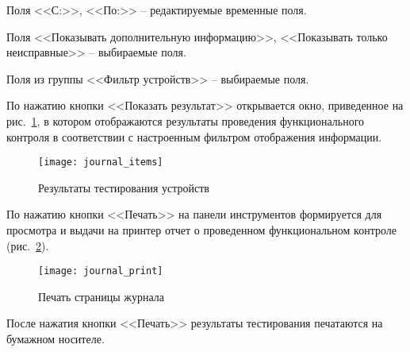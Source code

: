 Поля <<С:>>, <<По:>> – редактируемые временные поля.

Поля <<Показывать дополнительную информацию>>, <<Показывать только неисправные>> – выбираемые поля.

Поля из группы <<Фильтр устройств>> – выбираемые поля.

По нажатию кнопки <<Показать результат>> открывается окно, приведенное на
рис.~\ref{fig:guide:user_guide:journal:journal_items}, в котором отображаются результаты проведения функционального контроля
в соответствии с настроенным фильтром отображения информации.
\begin{figure}[h]
	\centering
	\texttt{[image: journal\_items]}
	\caption{Результаты тестирования устройств}
	\label{fig:guide:user_guide:journal:journal_items}
\end{figure}

По нажатию кнопки <<Печать>> на панели инструментов формируется для просмотра и выдачи на принтер отчет о проведенном
функциональном контроле (рис.~\ref{fig:guide:user_guide:journal:journal_print}).
\begin{figure}[!htb]
	\centering
	\texttt{[image: journal\_print]}
	\caption{Печать страницы журнала}
	\label{fig:guide:user_guide:journal:journal_print}
\end{figure}

После нажатия кнопки <<Печать>> результаты тестирования печатаются на бумажном носителе.

